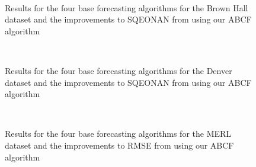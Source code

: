 \begin{figure}[!t]
	\begin{center}
		 \\
	\end{center}
	\caption{Results for the four base forecasting algorithms for the Brown Hall dataset and the improvements to SQEONAN from using our ABCF algorithm}
	\label{fig:sqe_brown_results}
\end{figure}

\begin{figure}[!b]
	\begin{center}
		 \\
	\end{center}
	\caption{Results for the four base forecasting algorithms for the Denver dataset and the improvements to SQEONAN from using our ABCF algorithm}
	\label{fig:sqe_denver_results}
\end{figure}

\newpage

\begin{figure}[!h]
	\begin{center}
		 \\
	\end{center}
	\caption{Results for the four base forecasting algorithms for the MERL dataset and the improvements to RMSE from using our ABCF algorithm}
	\label{fig:rmse_merl_results}
\end{figure}

